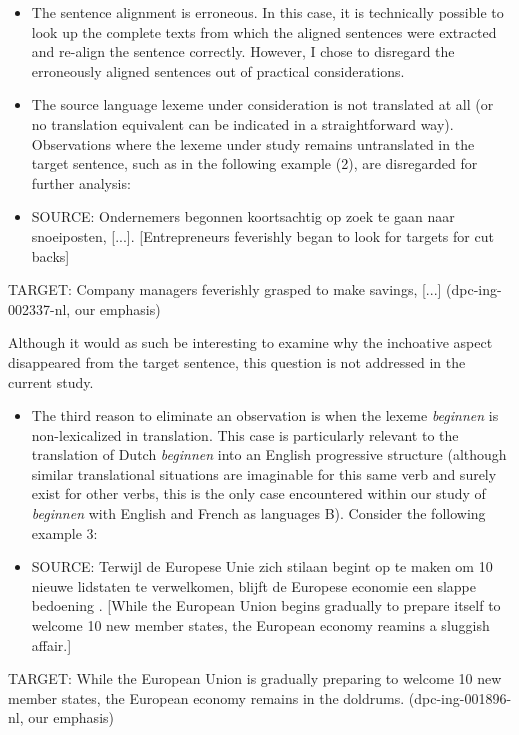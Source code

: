 \begin{itemize}
\item 
The sentence alignment is erroneous. In this case, it is technically possible to look up the complete texts from which the aligned sentences were extracted and re-align the sentence correctly. However, I chose to disregard the erroneously aligned sentences out of practical considerations.
\item 
The source language lexeme under consideration is not translated at all (or no translation equivalent can be indicated in a straightforward way). Observations where the lexeme under study remains untranslated in the target sentence, such as in the following example (2), are disregarded for further analysis:
\end{itemize}
\begin{itemize}
\item \begin{styleVoorbeeld}
SOURCE: Ondernemers begonnen koortsachtig op zoek te gaan naar snoeiposten, [...]. [Entrepreneurs feverishly began to look for targets for cut backs]
\end{styleVoorbeeld}\end{itemize}
\begin{styleVoorbeeld}
TARGET: Company managers feverishly grasped to make savings, [...] (dpc-ing-002337-nl, our emphasis)
\end{styleVoorbeeld}

Although it would as such be interesting to examine why the inchoative aspect disappeared from the target sentence, this question is not addressed in the current study.


\begin{itemize}
\item 
The third reason to eliminate an observation is when the lexeme \textit{beginnen} is non-lexicalized in translation. This case is particularly relevant to the translation of Dutch \textit{beginnen} into an English progressive structure (although similar translational situations are imaginable for this same verb and surely exist for other verbs, this is the only case encountered within our study of \textit{beginnen} with English and French as languages B). Consider the following example 3:
\end{itemize}
\begin{itemize}
\item \begin{styleVoorbeeld}
SOURCE: Terwijl de Europese Unie zich stilaan begint op te maken om 10 nieuwe lidstaten te verwelkomen, blijft de Europese economie een slappe bedoening . [While the European Union begins gradually to prepare itself to welcome 10 new member states, the European economy reamins a sluggish affair.]
\end{styleVoorbeeld}\end{itemize}
\begin{styleVoorbeeld}
  TARGET: While the European Union is gradually preparing to welcome 10 new member states, the European economy remains in the doldrums. (dpc-ing-001896-nl, our emphasis)
\end{styleVoorbeeld}


